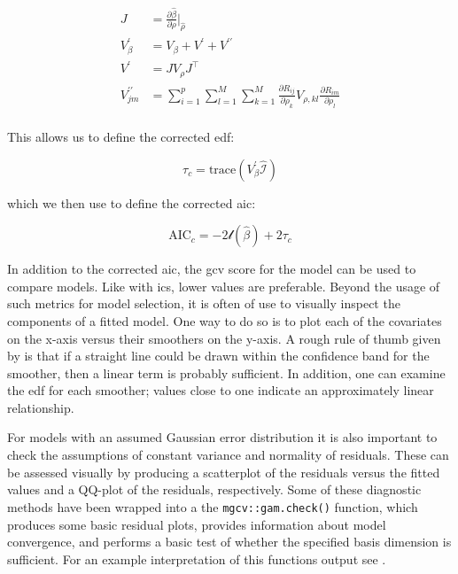 \documentclass{report}
\begin{document}
\begin{equation}\label{eq:glm-gam-vcov-matrices}
    \begin{aligned}
        J &= \frac{\partial\hat{\beta}}{\partial\rho} \bigg |_{\hat{\rho}} \\
        V^\prime_\beta &= V_\beta + V^\prime + V^{\prime\prime} \\
        V^\prime &= JV_\rho J^\intercal \\
        V^{\prime\prime}_{jm} &= \sum_{i=1}^p\sum_{l=1}^M\sum_{k=1}^M \frac{\partial R_{ij}}{\partial\rho_k} V_{\rho, kl} \frac{\partial R_{im}}{\partial\rho_l} \\
    \end{aligned}
\end{equation}

This allows us to define the corrected \gls{edf}:

\begin{equation}\label{eq:glm-gam-corrected-edf}
    \tau_c = \text{trace}\left(V_\beta^\prime \hat{\mathcal{I}}\right)
\end{equation}

which we then use to define the corrected \gls{aic}:

\begin{equation}\label{eq:glm-gam-corrected-aic}
    \text{AIC}_c = -2\mathcal{l}\left(\hat{\beta}\right) + 2\tau_c
\end{equation}

In addition to the corrected \gls{aic}, the \gls{gcv} score for the model can be used to compare models. Like with \glspl{ic}, lower values are preferable. Beyond the usage of such metrics for model selection, it is often of use to visually inspect the components of a fitted model. One way to do so is to plot each of the covariates on the x-axis versus their smoothers on the y-axis. A rough rule of thumb given by \cite[Chapter~15.2]{faraway_extending_2016} is that if a straight line could be drawn within the confidence band for the smoother, then a linear term is probably sufficient. In addition, one can examine the \gls{edf} for each smoother; values close to one indicate an approximately linear relationship. 

For models with an assumed Gaussian error distribution it is also important to check the assumptions of constant variance and normality of residuals. These can be assessed visually by producing a scatterplot of the residuals versus the fitted values and a QQ-plot of the residuals, respectively. Some of these diagnostic methods have been wrapped into a the \texttt{mgcv::gam.check()} function, which produces some basic residual plots, provides information about model convergence, and performs a basic test of whether the specified basis dimension is sufficient. For an example interpretation of this functions output see \cite[Chapter~7.2.1]{wood_generalized_2017}. 
\end{document}
